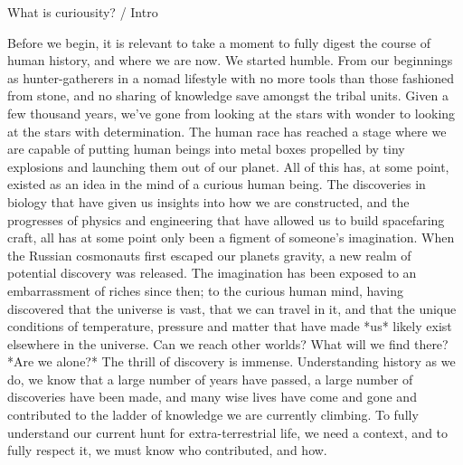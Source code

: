 What is curiousity? / Intro

Before we begin, it is relevant to take a moment to fully digest the course of human history, and where we are now. We started humble. From our beginnings as hunter-gatherers in a nomad lifestyle with no more tools than those fashioned from stone, and no sharing of knowledge save amongst the tribal units. Given a few thousand years, we've gone from looking at the stars with wonder to looking at the stars with determination. The human race has reached a stage where we are capable of putting human beings into metal boxes propelled by tiny explosions and launching them out of our planet. All of this has, at some point, existed as an idea in the mind of a curious human being. The discoveries in biology that have given us insights into how we are constructed, and the progresses of physics and engineering that have allowed us to build spacefaring craft, all has at some point only been a figment of someone's imagination. 
When the Russian cosmonauts first escaped our planets gravity, a new realm of potential discovery was released. The imagination has been exposed to an embarrassment of riches since then; to the curious human mind, having discovered that the universe is vast, that we can travel in it, and that the unique conditions of temperature, pressure and matter that have made *us* likely exist elsewhere in the universe.  
Can we reach other worlds? What will we find there? *Are we alone?* The thrill of discovery is immense. Understanding history as we do, we know that a large number of years have passed, a large number of discoveries have been made, and many wise lives have come and gone and contributed to the ladder of knowledge we are currently climbing. To fully understand our current hunt for extra-terrestrial life, we need a context, and to fully respect it, we must know who contributed, and how.

